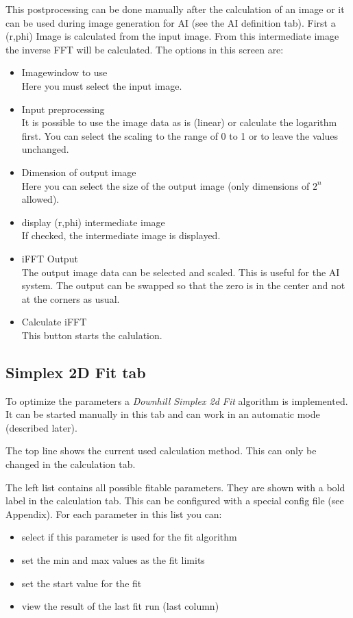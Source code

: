 \documentclass[11pt]{article} %
\begin{document}
This postprocessing can be done manually after the calculation of an image or it can be used during image generation for AI (see the AI definition tab). First a (r,phi) Image is calculated from the input image. From this intermediate image the inverse FFT will be calculated. The options in this screen are:
\begin{itemize}\itemsep0pt
\item Imagewindow to use \\
	Here you must select the input image.
\item Input preprocessing \\
	It is possible to use the image data as is (linear) or calculate the logarithm first. You can select the scaling to the range of 0 to 1 or to leave the values unchanged.
\item Dimension of output image \\
	Here you can select the size of the output image (only dimensions of $2^n$ allowed).
\item display (r,phi) intermediate image \\
	If checked, the intermediate image is displayed.
\item iFFT Output \\
	The output image data can be selected and scaled. This is useful for the AI system. The output can be swapped so that the zero is in the center and not at the corners as usual.
\item Calculate iFFT \\
	This button starts the calulation.
\end{itemize}


\subsection{Simplex 2D Fit tab}

To optimize the parameters a {\it Downhill Simplex 2d Fit} algorithm is implemented. It can be started manually in this tab and can work in an automatic mode (described later).

The top line shows the current used calculation method. This can only be changed in the calculation tab.

The left list contains all possible fitable parameters. They are shown with a bold label in the calculation tab. This can be configured with a special config file (see Appendix). For each parameter in this list you can:
\begin{itemize}\itemsep0pt
\item select if this parameter is used for the fit algorithm
\item set the min and max values as the fit limits
\item set the start value for the fit
\item view the result of the last fit run (last column)
\end{itemize}
\end{document}
